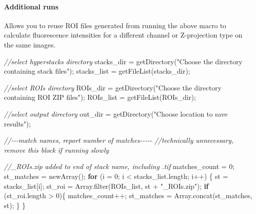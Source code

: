 \documentclass[
  12pt,
  a4paper,
]{book}
\newenvironment{Shaded}{}{}
\newcommand{\CommentTok}[1]{\textcolor[rgb]{0.38,0.63,0.69}{\textit{#1}}}
\newcommand{\ControlFlowTok}[1]{\textcolor[rgb]{0.00,0.44,0.13}{\textbf{#1}}}
\newcommand{\DecValTok}[1]{\textcolor[rgb]{0.25,0.63,0.44}{#1}}
\newcommand{\NormalTok}[1]{#1}
\newcommand{\OperatorTok}[1]{\textcolor[rgb]{0.40,0.40,0.40}{#1}}
\newcommand{\StringTok}[1]{\textcolor[rgb]{0.25,0.44,0.63}{#1}}
\begin{document}
\hypertarget{additional-runs}{%
\paragraph{Additional runs}\label{additional-runs}}

Allows you to reuse ROI files generated from running the above macro to calculate fluorescence intensities for a different channel or Z-projection type on the same images.

\begin{Shaded}
\begin{Highlighting}[]
\CommentTok{//select hyperstacks directory}
\NormalTok{stacks\_dir }\OperatorTok{=}\NormalTok{ getDirectory}\OperatorTok{(}\StringTok{"Choose the directory containing stack files"}\OperatorTok{);}
\NormalTok{stacks\_list }\OperatorTok{=}\NormalTok{  getFileList}\OperatorTok{(}\NormalTok{stacks\_dir}\OperatorTok{);}

\CommentTok{//select ROIs directory}
\NormalTok{ROIs\_dir }\OperatorTok{=}\NormalTok{ getDirectory}\OperatorTok{(}\StringTok{"Choose the directory containing ROI ZIP files"}\OperatorTok{);}
\NormalTok{ROIs\_list }\OperatorTok{=}\NormalTok{ getFileList}\OperatorTok{(}\NormalTok{ROIs\_dir}\OperatorTok{);}

\CommentTok{//select output directory}
\NormalTok{out\_dir }\OperatorTok{=}\NormalTok{ getDirectory}\OperatorTok{(}\StringTok{"Choose location to save results"}\OperatorTok{);}

\CommentTok{//{-}{-}{-}match names, report number of matches{-}{-}{-}{-}{-}}
\CommentTok{//technically unnecessary, remove this block if running slowly}

\CommentTok{//\_ROIs.zip added to end of stack name, including .tif}
\NormalTok{matches\_count }\OperatorTok{=} \DecValTok{0}\OperatorTok{;}
\NormalTok{st\_matches }\OperatorTok{=}\NormalTok{ newArray}\OperatorTok{();}
\ControlFlowTok{for} \OperatorTok{(}\NormalTok{i }\OperatorTok{=} \DecValTok{0}\OperatorTok{;}\NormalTok{ i }\OperatorTok{\textless{}}\NormalTok{ stacks\_list}\OperatorTok{.}\NormalTok{length}\OperatorTok{;}\NormalTok{ i}\OperatorTok{++)} \OperatorTok{\{}
\NormalTok{    st }\OperatorTok{=}\NormalTok{ stacks\_list}\OperatorTok{[}\NormalTok{i}\OperatorTok{];}
\NormalTok{    st\_roi }\OperatorTok{=}\NormalTok{ Array}\OperatorTok{.}\NormalTok{filter}\OperatorTok{(}\NormalTok{ROIs\_list}\OperatorTok{,}\NormalTok{ st }\OperatorTok{+} \StringTok{"\_ROIs.zip"}\OperatorTok{);}
    \ControlFlowTok{if} \OperatorTok{(}\NormalTok{st\_roi}\OperatorTok{.}\NormalTok{length }\OperatorTok{\textgreater{}} \DecValTok{0}\OperatorTok{)\{}
\NormalTok{        matches\_count}\OperatorTok{++;}
\NormalTok{        st\_matches }\OperatorTok{=}\NormalTok{ Array}\OperatorTok{.}\NormalTok{concat}\OperatorTok{(}\NormalTok{st\_matches}\OperatorTok{,}\NormalTok{ st}\OperatorTok{);}
    \OperatorTok{\}}
\OperatorTok{\}}


\end{Highlighting}
\end{Shaded}
\end{document}
